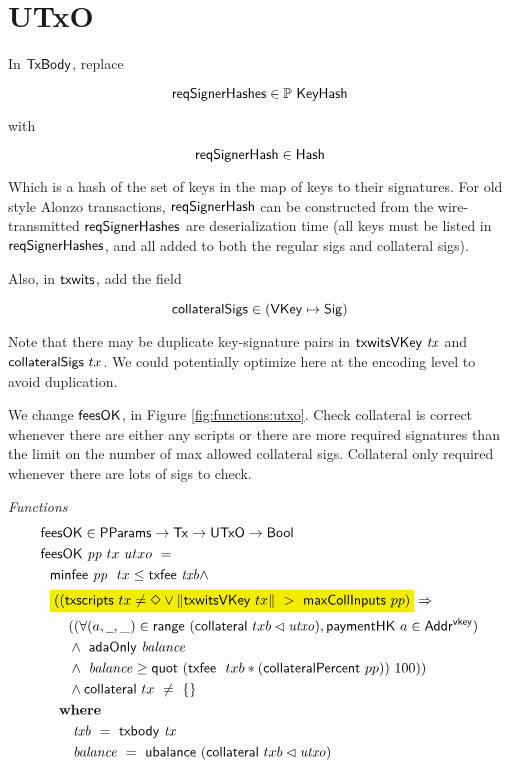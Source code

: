 \section{UTxO}
\label{sec:utxo}

In $\mathsf{TxBody}$, replace

\[\mathsf{reqSignerHashes} \in \mathbb{P}~\mathsf{KeyHash} \]

with

\[ \mathsf{reqSignerHash} \in \mathsf{Hash} \]

Which is a hash of the set of keys in the map of keys to their signatures.
For old style Alonzo transactions,
$\mathsf{reqSignerHash}$ can be constructed from the wire-transmitted $\mathsf{reqSignerHashes}$
are deserialization time (all keys must be listed in $\mathsf{reqSignerHashes}$, and all
added to both the regular sigs and collateral sigs).

Also, in $\mathsf{txwits}$, add the field

\[\mathsf{collateralSigs} \in (\mathsf{VKey} \mapsto \mathsf{Sig})\]

Note that there may be duplicate key-signature pairs in $\mathsf{txwitsVKey}~\mathit{tx}$
and $\mathsf{collateralSigs}~{tx}$. We could potentially optimize here at the
encoding level to avoid duplication.

We change $\mathsf{feesOK}$, in Figure \ref{fig:functions:utxo}.
Check collateral is correct whenever there are either any scripts or there are more
required signatures than the limit on the number of max allowed collateral sigs.
Collateral only required whenever there are lots of sigs to check.

\begin{figure*}[htb]
  \emph{Functions}
  \begin{align*}
    & \fun{feesOK} \in \PParams \to \Tx \to \UTxO \to \Bool  \\
    & \fun{feesOK}~\var{pp}~tx~utxo~= \\
    &~~      \minfee{pp}~{tx} \leq \txfee{txb} \wedge \\
    &~~ \hldiff{((\fun{txscripts}~tx \neq \Nothing \vee \|\fun{txwitsVKey}~{tx}\| ~>~ \fun{maxCollInputs}~{pp})} \Rightarrow \\
    &~~~~~~((\forall (a, \wcard, \_) \in \fun{range}~(\fun{collateral}~{txb} \restrictdom \var{utxo}), \fun{paymentHK}~a \in \AddrVKey) \\
    &~~~~~~\wedge~ \fun{adaOnly}~\var{balance} \\
    &~~~~~~\wedge~ \var{balance} \geq \fun{quot}~(\txfee~{txb} * (\fun{collateralPercent}~pp))~100)) \\
    &~~~~~~\wedge \fun{collateral}~{tx}~ \neq~\{\} \\
    &~~      \where \\
    & ~~~~~~~ \var{txb}~=~\txbody{tx} \\
    & ~~~~~~~ \var{balance}~=~\fun{ubalance}~(\fun{collateral}~{txb} \restrictdom \var{utxo})
  \end{align*}
  \caption{Functions related to fees and collateral}
  \label{fig:functions:utxo}
\end{figure*}


